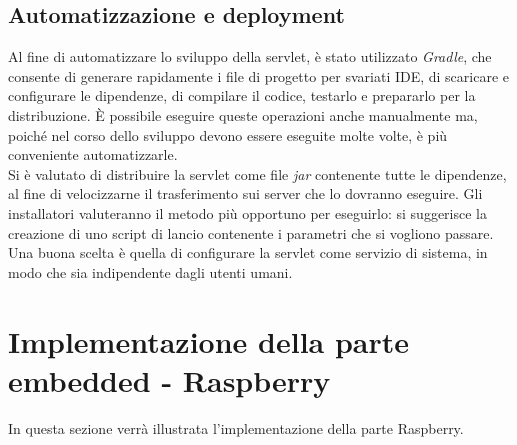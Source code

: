 \subsection{Automatizzazione e deployment}
Al fine di automatizzare lo sviluppo della servlet, è stato utilizzato \textit{Gradle}, che consente di generare rapidamente i file di progetto per svariati IDE, di scaricare e configurare le dipendenze, di compilare il codice, testarlo e prepararlo per la distribuzione.
È possibile eseguire queste operazioni anche manualmente ma, poiché nel corso dello sviluppo devono essere eseguite molte volte, è più conveniente automatizzarle.
\\Si è valutato di distribuire la servlet come file \textit{jar} contenente tutte le dipendenze, al fine di velocizzarne il trasferimento sui server che lo dovranno eseguire.
Gli installatori valuteranno il metodo più opportuno per eseguirlo: si suggerisce la creazione di uno script di lancio contenente i parametri che si vogliono passare.
Una buona scelta è quella di configurare la servlet come servizio di sistema, in modo che sia indipendente dagli utenti umani.


\section{Implementazione della parte embedded - Raspberry}
In questa sezione verrà illustrata l'implementazione della parte Raspberry.

